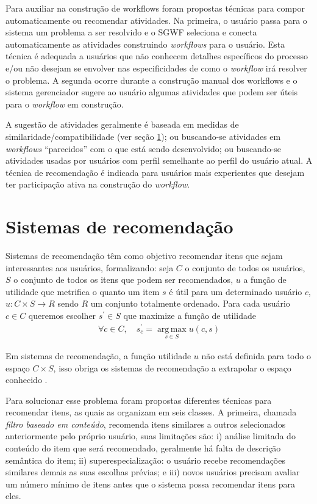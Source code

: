 Para auxiliar na construção de workflows foram propostas técnicas para compor automaticamente ou recomendar atividades. Na primeira, o usuário passa para o sistema um problema a ser resolvido e o SGWF seleciona e conecta automaticamente as atividades construindo \emph{workflows} para o usuário. Esta técnica é adequada a usuários que não conhecem detalhes específicos do processo e/ou não desejam se envolver nas especificidades de como o \emph{workflow} irá resolver o problema. A segunda ocorre durante a construção manual dos workflows e o sistema gerenciador sugere ao usuário algumas atividades que podem ser úteis para o \emph{workflow} em construção. 

A sugestão de atividades geralmente é baseada em medidas de similaridade/compatibilidade (ver seção \ref{SEC_SISTEMAS_RECOMENDACAO}); ou buscando-se atividades em \emph{workflows} ``parecidos'' com o que está sendo desenvolvido; ou buscando-se atividades usadas por usuários com perfil semelhante ao perfil do usuário atual. A técnica de recomendação é indicada para usuários mais experientes que desejam ter participação ativa na construção do \emph{workflow}.


\section{Sistemas de recomendação}\label{SEC_SISTEMAS_RECOMENDACAO}
Sistemas de recomendação têm como objetivo recomendar itens que sejam interessantes aos usuários, formalizando: seja \(C\) o conjunto de todos os usuários, \(S\) o conjunto de todos os itens que podem ser recomendados, \(u\) a função de utilidade que metrifica o quanto um item \(s\) é útil para um determinado usuário \(c\), \(u:C \times S\rightarrow R\) sendo \(R\) um conjunto totalmente ordenado. Para cada usuário \(c \in C \) queremos escolher \(s^{'} \in S \) que maximize a função de utilidade 
\begin{align}
\forall c \in C,  \quad s_{c}^{'} =  \operatorname*{arg\,max}_{s \in S} u(c,s) \label{formalizar_recomendacao}
\end{align}

Em sistemas de recomendação, a função utilidade \(u\) não está definida para todo o espaço \(C \times S\), isso obriga os sistemas de recomendação a extrapolar o espaço conhecido \cite{Adomavicius2005}.

Para solucionar esse problema foram propostas diferentes técnicas para recomendar itens, as quais  as organizam em seis classes. A primeira, chamada \emph{filtro baseado em conteúdo}, recomenda itens similares a outros selecionados anteriormente pelo próprio usuário, suas limitações são: i) análise limitada do conteúdo do item que será recomendado, geralmente há falta de descrição semântica do item; ii) superespecialização: o usuário recebe recomendações similares demais as suas escolhas prévias; e iii) novos usuários precisam avaliar um número mínimo de itens antes que o sistema possa recomendar itens para eles.

